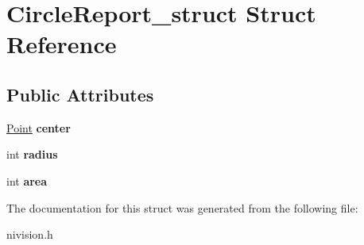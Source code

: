 \hypertarget{structCircleReport__struct}{\section{\-Circle\-Report\-\_\-struct \-Struct \-Reference}
\label{structCircleReport__struct}
}
\subsection*{\-Public \-Attributes}
\begin{DoxyCompactItemize}
\item 
\hypertarget{structCircleReport__struct_a8434fb4cd934d0685cc8ccb8a179a573}{\hyperlink{structPoint__struct}{\-Point} {\bfseries center}}\label{structCircleReport__struct_a8434fb4cd934d0685cc8ccb8a179a573}

\item 
\hypertarget{structCircleReport__struct_a06d89c26bdad438e7d7097638e2bda80}{int {\bfseries radius}}\label{structCircleReport__struct_a06d89c26bdad438e7d7097638e2bda80}

\item 
\hypertarget{structCircleReport__struct_a1905ca1daa64ff0d6a25ee66d7851d8f}{int {\bfseries area}}\label{structCircleReport__struct_a1905ca1daa64ff0d6a25ee66d7851d8f}

\end{DoxyCompactItemize}


\-The documentation for this struct was generated from the following file\-:\begin{DoxyCompactItemize}
\item 
nivision.\-h\end{DoxyCompactItemize}
